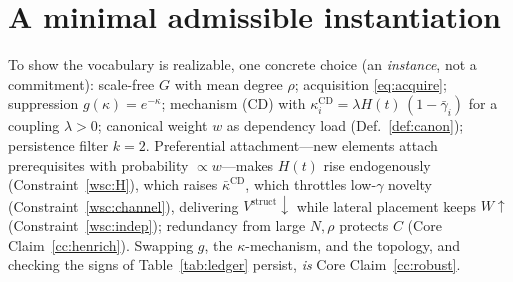 \documentclass[11pt,letterpaper]{article}
\theoremstyle{definition}
\theoremstyle{plain}
\begin{document}
\section{A minimal admissible instantiation}\label{sec:instantiation}

To show the vocabulary is realizable, one concrete choice (an \emph{instance},
not a commitment): scale-free $G$ with mean degree $\rho$; acquisition
\eqref{eq:acquire}; suppression $g(\kappa)=e^{-\kappa}$; mechanism (CD) with
$\kappa^{\mathrm{CD}}_i = \lambda H(t)\,(1-\bar\gamma_i)$ for a coupling
$\lambda>0$; canonical weight $w$ as dependency load (Def.~\ref{def:canon});
persistence filter $k=2$. Preferential attachment---new elements attach
prerequisites with probability $\propto w$---makes $H(t)$ rise endogenously
(Constraint~\ref{wsc:H}), which raises $\bar\kappa^{\mathrm{CD}}$, which throttles
low-$\gamma$ novelty (Constraint~\ref{wsc:channel}), delivering
$V^{\mathrm{struct}}\!\downarrow$ while lateral placement keeps $W\!\uparrow$
(Constraint~\ref{wsc:indep}); redundancy from large $N,\rho$ protects $C$
(Core Claim~\ref{cc:henrich}). Swapping $g$, the $\kappa$-mechanism, and the
topology, and checking the signs of Table~\ref{tab:ledger} persist, \emph{is}
Core Claim~\ref{cc:robust}.
\end{document}

